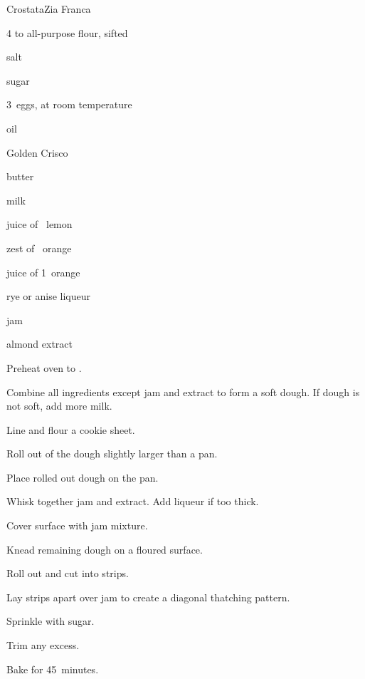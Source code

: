 \begin{recipe}{Crostata}{Zia Franca}{}

\begin{ingredients}
\item 4\half{} to  all-purpose flour, sifted
\item \tp{\quarter} salt
\item \Tp{2\half}
\item {} sugar
\item 3~eggs, at room temperature
\item \C{\half} oil
\item \C{\quarter} Golden Crisco
\item \C{\quarter} butter
\item \C{\half} milk
\item juice of \half~lemon
\item zest of \half~orange
\item juice of 1~orange
\item {} rye or anise liqueur
\item {} jam
\item \tp{\half} almond extract
\end{ingredients}

\begin{directions}
\item Preheat oven to .
\item Combine all ingredients except jam and extract to form a soft dough. If dough is not soft, add more milk.
\item Line and flour a cookie sheet.
\item Roll out \twothird{} of the dough slightly larger than a pan.
\item Place rolled out dough on the pan.
\item Whisk together jam and extract. Add liqueur if too thick.
\item Cover surface with jam mixture.
\item Knead remaining dough on a floured surface.
\item Roll out and cut into \inch{\half} strips.
\item Lay strips  apart over jam to create a diagonal thatching pattern.
\item Sprinkle with sugar.
\item Trim any excess.
\item Bake for 45~minutes.
\end{directions}

\end{recipe}
